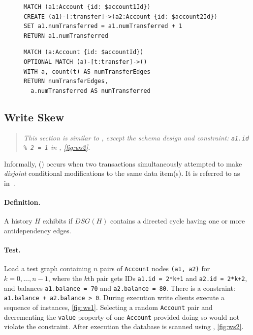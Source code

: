 \begin{figure}[htb]
\centering
\begin{minipage}{0.41\linewidth}
\begin{lstlisting}[language=cypher,label=fig:lu1,caption=\tx{Lost Update $T_\mathrm{W}$}.]
MATCH (a1:Account {id: $account1Id})
CREATE (a1)-[:transfer]->(a2:Account {id: $account2Id})
SET a1.numTransferred = a1.numTransferred + 1
RETURN a1.numTransferred
\end{lstlisting}
\end{minipage}
\quad
\begin{minipage}{0.52\linewidth}
\begin{lstlisting}[language=cypher,label=fig:lu2,caption=\tx{Lost Update $T_\mathrm{R}$}.]
MATCH (a:Account {id: $accountId})
OPTIONAL MATCH (a)-[t:transfer]->()
WITH a, count(t) AS numTransferEdges
RETURN numTransferEdges,
  a.numTransferred AS numTransferred
\end{lstlisting}
\end{minipage}
\end{figure}

\subsection{Write Skew}
\label{sec:write-skew}

\begin{quote}
  \textit{This section is similar to \ldbcsnb, except the schema design and 
          constraint: \texttt{a1.id \% 2 = 1} in , \autoref{fig:ws2}.
  }
\end{quote}

Informally,  () occurs when two transactions 
simultaneously attempted to make \emph{disjoint} conditional modifications to 
the same data item(s). It is referred to as  
in~\cite{adya1999weak,DBLP:journals/tods/FeketeLOOS05}.

\paragraph{Definition.}
A history $H$ exhibits  if $\textit{DSG}(H)$ contains a directed 
cycle having one or more antidependency edges.

\paragraph{Test.}
Load a test graph containing $n$ pairs of \texttt{Account} nodes 
\texttt{(a1, a2)} for $k = 0, \ldots, n-1$, where the $k$th pair gets IDs 
\texttt{a1.id = 2*k+1} and \texttt{a2.id = 2*k+2}, and balances 
\texttt{a1.balance = 70} and \texttt{a2.balance = 80}. There is a constraint: 
\texttt{a1.balance + a2.balance > 0}. During execution write clients execute a 
sequence of  instances, \autoref{fig:ws1}. Selecting a 
random \texttt{Account} pair and decrementing the \texttt{value} property of 
one \texttt{Account} provided doing so would not violate the constraint. After
execution the database is scanned using , \autoref{fig:ws2}.

